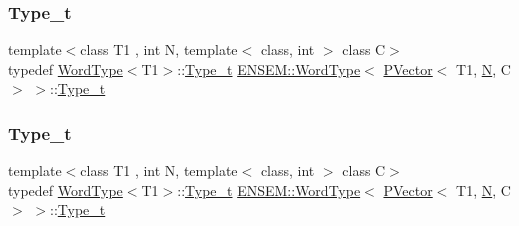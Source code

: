 \subsubsection{\texorpdfstring{Type\_t}{Type\_t}\hspace{0.1cm}{\footnotesize\ttfamily [1/3]}}
{\footnotesize\ttfamily template$<$class T1 , int N, template$<$ class, int $>$ class C$>$ \\
typedef \mbox{\hyperlink{structENSEM_1_1WordType}{Word\+Type}}$<$T1$>$\+::\mbox{\hyperlink{structENSEM_1_1WordType_3_01PVector_3_01T1_00_01N_00_01C_01_4_01_4_aa9f3aa443de1a825586cd47f6d842fe8}{Type\+\_\+t}} \mbox{\hyperlink{structENSEM_1_1WordType}{E\+N\+S\+E\+M\+::\+Word\+Type}}$<$ \mbox{\hyperlink{classENSEM_1_1PVector}{P\+Vector}}$<$ T1, \mbox{\hyperlink{adat__devel_2lib_2hadron_2operator__name__util_8cc_a7722c8ecbb62d99aee7ce68b1752f337}{N}}, C $>$ $>$\+::\mbox{\hyperlink{structENSEM_1_1WordType_3_01PVector_3_01T1_00_01N_00_01C_01_4_01_4_aa9f3aa443de1a825586cd47f6d842fe8}{Type\+\_\+t}}}

\mbox{\label{structENSEM_1_1WordType_3_01PVector_3_01T1_00_01N_00_01C_01_4_01_4_aa9f3aa443de1a825586cd47f6d842fe8}} 
\subsubsection{\texorpdfstring{Type\_t}{Type\_t}\hspace{0.1cm}{\footnotesize\ttfamily [2/3]}}
{\footnotesize\ttfamily template$<$class T1 , int N, template$<$ class, int $>$ class C$>$ \\
typedef \mbox{\hyperlink{structENSEM_1_1WordType}{Word\+Type}}$<$T1$>$\+::\mbox{\hyperlink{structENSEM_1_1WordType_3_01PVector_3_01T1_00_01N_00_01C_01_4_01_4_aa9f3aa443de1a825586cd47f6d842fe8}{Type\+\_\+t}} \mbox{\hyperlink{structENSEM_1_1WordType}{E\+N\+S\+E\+M\+::\+Word\+Type}}$<$ \mbox{\hyperlink{classENSEM_1_1PVector}{P\+Vector}}$<$ T1, \mbox{\hyperlink{adat__devel_2lib_2hadron_2operator__name__util_8cc_a7722c8ecbb62d99aee7ce68b1752f337}{N}}, C $>$ $>$\+::\mbox{\hyperlink{structENSEM_1_1WordType_3_01PVector_3_01T1_00_01N_00_01C_01_4_01_4_aa9f3aa443de1a825586cd47f6d842fe8}{Type\+\_\+t}}}

